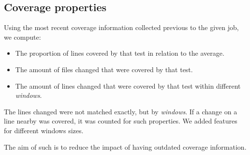 \subsection{Coverage properties}

Using the most recent coverage information collected previous to
the given job, we compute:
\begin{itemize}
    \item The proportion of lines covered by that test in relation to the average.
    \item The amount of files changed that were covered by that test.
    \item The amount of lines changed that were covered by that test within different \emph{windows}.
\end{itemize}

The lines changed were not matched exactly, but by \emph{windows}. If a change on a
line nearby was covered, it was counted for such properties. We added features for
different windows sizes.

The aim of such is to reduce the impact of having outdated coverage information.